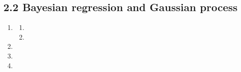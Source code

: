 \documentclass{article}
\begin{document}
\subsection*{2.2 Bayesian regression and Gaussian process}

\begin{enumerate}

\item %

\begin{enumerate}

\item %

\item %

\end{enumerate}

\item %

\item %

\item %


\end{enumerate}
\end{document}
